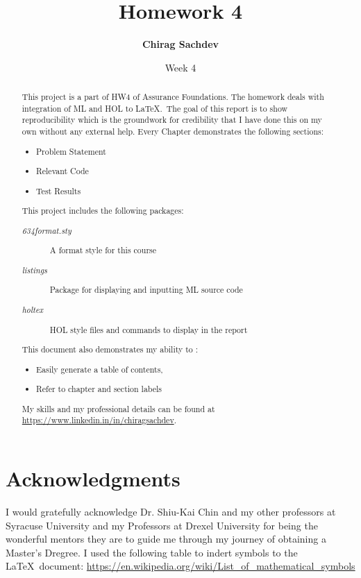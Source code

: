 \documentclass{report}
\title{Homework 4}
\author{\textbf{Chirag Sachdev}}
\date{Week 4}
\begin{document}
\lstset{language=ML}
\maketitle{}

\begin{abstract}
This project is a part of HW4 of Assurance Foundations. The homework deals with integration of ML and HOL to \LaTeX.\ The goal of this report is to show reproducibility which is the groundwork for credibility that I have done this on my own without any external help. Every Chapter demonstrates the following sections:
	\begin{itemize}
		\item Problem Statement
		\item Relevant Code
		\item Test Results
	\end{itemize}
	
This project includes the following packages:
	\begin{description}
		\item[\emph{634format.sty}] A format style for this course
		\item[\emph{listings}] Package for displaying and inputting ML source code
		\item[\emph{holtex}] HOL style files and commands to display in the report
	\end{description}

This document also demonstrates my ability to :
	\begin{itemize}
		\item Easily generate a table of contents,
		\item Refer to chapter and section labels
	\end{itemize}

My skills and my professional details can be found at \url{https://www.linkedin.in/in/chiragsachdev}.
\end{abstract}

\section*{Acknowledgments}
I would gratefully acknowledge Dr. Shiu-Kai Chin and my other professors at Syracuse University and my Professors at Drexel University for being the wonderful mentors they are to guide me through my journey of obtaining a Master's Dregree.
I used the following table to indert symbols to the \LaTeX\ document: \url{https://en.wikipedia.org/wiki/List_of_mathematical_symbols}
\tableofcontents{}
\end{document}
